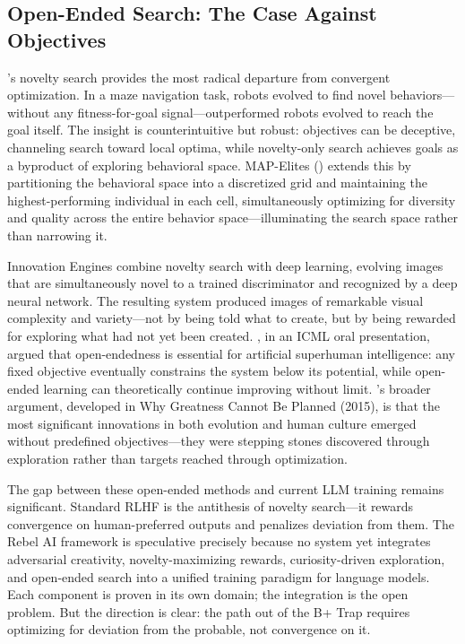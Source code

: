 \documentclass[12pt,a4paper]{article}
\begin{document}
\subsection{Open-Ended Search: The Case Against Objectives}
\citeauthor{stanley2011}'s novelty search \citep{stanley2011} provides the most radical departure from convergent optimization. In a maze navigation task, robots evolved to find novel behaviors---without any fitness-for-goal signal---outperformed robots evolved to reach the goal itself. The insight is counterintuitive but robust: objectives can be deceptive, channeling search toward local optima, while novelty-only search achieves goals as a byproduct of exploring behavioral space. MAP-Elites (\citealt{mouret2015}) extends this by partitioning the behavioral space into a discretized grid and maintaining the highest-performing individual in each cell, simultaneously optimizing for diversity and quality across the entire behavior space---illuminating the search space rather than narrowing it.

Innovation Engines \citep{nguyen2015} combine novelty search with deep learning, evolving images that are simultaneously novel to a trained discriminator and recognized by a deep neural network. The resulting system produced images of remarkable visual complexity and variety---not by being told what to create, but by being rewarded for exploring what had not yet been created. \citet{hughes2024}, in an ICML oral presentation, argued that open-endedness is essential for artificial superhuman intelligence: any fixed objective eventually constrains the system below its potential, while open-ended learning can theoretically continue improving without limit. \citeauthor{stanley2011}'s broader argument, developed in Why Greatness Cannot Be Planned (2015), is that the most significant innovations in both evolution and human culture emerged without predefined objectives---they were stepping stones discovered through exploration rather than targets reached through optimization.

The gap between these open-ended methods and current LLM training remains significant. Standard RLHF is the antithesis of novelty search---it rewards convergence on human-preferred outputs and penalizes deviation from them. The Rebel AI framework is speculative precisely because no system yet integrates adversarial creativity, novelty-maximizing rewards, curiosity-driven exploration, and open-ended search into a unified training paradigm for language models. Each component is proven in its own domain; the integration is the open problem. But the direction is clear: the path out of the B+ Trap requires optimizing for deviation from the probable, not convergence on it.
\end{document}
